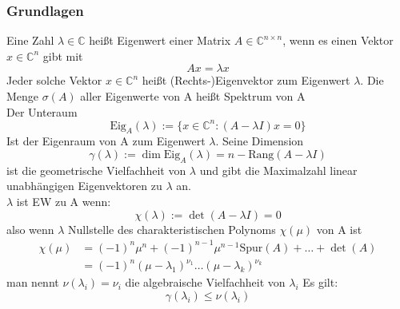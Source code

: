 \documentclass[
	ngerman,
	accentcolor=9c,%
	type=intern,
	marginpar=false
	]{tudapub}
\begin{document}
            \subsubsection{Grundlagen}
                \begin{definition}
                    Eine Zahl $\lambda \in \mathbb{C}$ heißt Eigenwert einer Matrix $A \in \mathbb{C}^{n \times n}$,
                    wenn es einen Vektor $x \in \mathbb{C}^n$ gibt mit
                    \begin{equation*}
                        Ax = \lambda x
                    \end{equation*}
                    Jeder solche Vektor $x \in \mathbb{C}^n$ heißt (Rechts-)Eigenvektor zum Eigenwert $\lambda$.
                    Die Menge $\sigma(A)$  aller Eigenwerte von A heißt Spektrum von A\\
                    Der Unteraum
                    \begin{equation*}
                        \text{Eig}_A(\lambda):= \{x \in \mathbb{C}^n: (A-\lambda I)x = 0\}
                    \end{equation*}
                    Ist der Eigenraum von A zum Eigenwert $\lambda$. Seine Dimension
                    \begin{equation*}
                        \gamma(\lambda):= \dim \text{Eig}_A(\lambda) = n - \text{Rang}(A-\lambda I)
                    \end{equation*}
                    ist die geometrische Vielfachheit von $\lambda$ und gibt die Maximalzahl linear unabhängigen Eigenvektoren zu $\lambda$ an.\\
                    $\lambda$ ist EW zu A wenn:
                    \begin{equation*}
                        \chi(\lambda):= \det(A-\lambda I) = 0
                    \end{equation*}
                    also wenn $\lambda$ Nullstelle des charakteristischen Polynoms $\chi(\mu)$ von A ist
                    \begin{align*}
                        \chi(\mu) &= (-1)^n \mu^n + (-1)^{n-1} \mu^{n-1}\text{Spur}(A)+\dots+\det(A)\\
                        &= (-1)^n (\mu - \lambda_1)^{\nu_1}\dots(\mu-\lambda_k)^{\nu_k}
                    \end{align*}
                    man nennt $\nu(\lambda_i) = \nu_i$ die algebraische Vielfachheit von $\lambda_i$
                    Es gilt:
                    \begin{equation*}
                        \gamma(\lambda_i)\leq\nu(\lambda_i)
                    \end{equation*}
                \end{definition}
\end{document}
